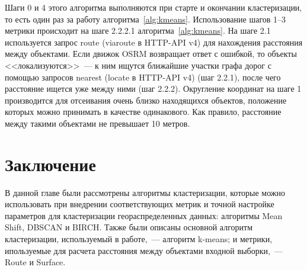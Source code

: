 Шаги 0 и 4 этого алгоритма выполняются при старте и окончании кластеризации, то есть один раз за работу алгоритма~\ref{alg:kmeans}. Использование шагов 1--3 метрики происходит на шаге 2.2.2.1 алгоритма~\ref{alg:kmeans}. На шаге 2.1 используется запрос route (viaroute в HTTP-API v4) для нахождения расстояния между объектами. Если движок OSRM возвращает ответ с ошибкой, то объекты <<локализуются>>~--- к ним ищутся ближайшие участки графа дорог с помощью запросов nearest (locate в HTTP-API v4) (шаг 2.2.1), после чего расстояние ищется уже между ними (шаг 2.2.2). Округление координат на шаге 1 производится для отсеивания очень близко находящихся объектов, положение которых можно принимать в качестве одинакового. Как правило, расстояние между такими объектами не превышает 10 метров.

\section{Заключение}
В данной главе были рассмотрены алгоритмы кластеризации, которые можно использовать при внедрении соответствующих метрик и точной настройке параметров для кластеризации геораспределенных данных: алгоритмы Mean Shift, DBSCAN и BIRCH. Также были описаны основной алгоритм кластеризации, используемый в работе,~--- алгоритм k-means; и метрики, ипользуемые для расчета расстояния между объектами входной выборки,~--- Route и Surface.
